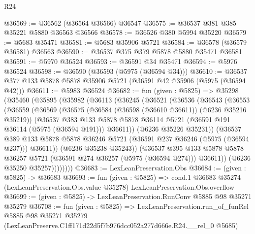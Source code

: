 \begin{lexlean}{R24}
\begin{coremodule}
@36569 := @36562 (@36564 @36566) @36547
@36575 := @36537 @381 @385 @35221 @5880 @36563 @36566
@36578 := @36526 @380 @5994 @35220
@36579 := @5683 @35471
@36581 := @5683 @35906 @5721
@36584 := @36578 (@36579 @36581) @36563
@36590 := @36537 @375 @379 @5878 @5880 @35471 @36581
@36591 := @5970 @36524
@36593 := @36591 @34 @35471
@36594 := @5976 @36524
@36598 := @36590 (@36593 (@5975 (@36594 @34)))
@36610 := @36537 @377 @133 @5878 @5878 @35906 @5721 (@36591 @42 @35906 (@5975 (@36594 @42)))
@36611 := @5983 @36524
@36682 := fun (given : @5825) =>
  @35298
    (@35460
      (@35895
        (@35982
          (@36113
            (@36245
              (@36521
                (@36536
                  (@36543
                    (@36553
                      (@36559
                        (@36569
                          (@36575
                            (@36584 (@36598 (@36610 @36611)) (@6236 @35216 @35219))
                            (@36537
                              @383
                              @133
                              @5878
                              @5878
                              @36114
                              @5721
                              (@36591 @191 @36114 (@5975 (@36594 @191)))
                              @36611))
                          (@6236 @35226 @35231))
                        (@36537
                          @389
                          @133
                          @5878
                          @5878
                          @36246
                          @5721
                          (@36591 @237 @36246 (@5975 (@36594 @237)))
                          @36611))
                      (@6236 @35238 @35243))
                    (@36537
                      @395
                      @133
                      @5878
                      @5878
                      @36257
                      @5721
                      (@36591 @274 @36257 (@5975 (@36594 @274)))
                      @36611))
                  (@6236 @35250 @35257))))))))
@36683 := LexLeanPreservation.Obs
@36684 := (given : @5825) -> @36683
@36693 := fun (given : @5825) =>
  cond.{1} @36683 @35274 (LexLeanPreservation.Obs.value @35278) LexLeanPreservation.Obs.overflow
@36699 := (given : @5825) -> LexLeanPreservation.RunConv @5885 @98 @35271 @35279
@36708 := fun (given : @5825) =>
  LexLeanPreservation.run_of_funRel
    @5885
    @98
    @35271
    @35279
    (LexLeanPreserve.C1ff171d22d5f7b976dcc052a277d666e.R24.__rel_0 @5685)
\end{coremodule}
\end{lexlean}
